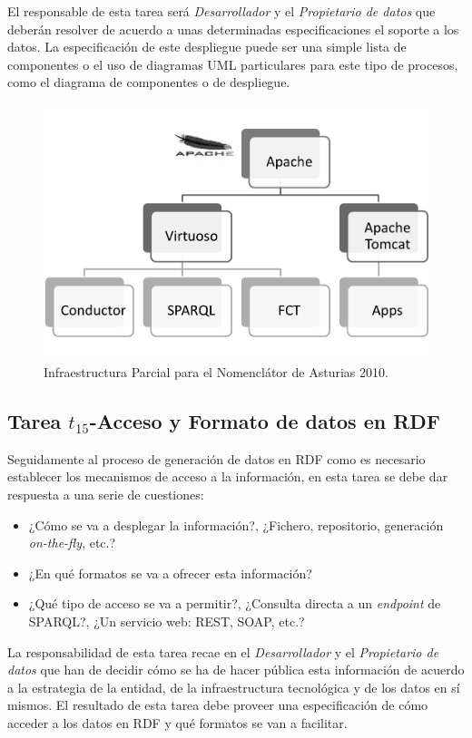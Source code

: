 El responsable de esta tarea será \textit{Desarrollador} y el \textit{Propietario de datos} que deberán
resolver de acuerdo a unas determinadas especificaciones el soporte a los datos. La especificación
de este despliegue puede ser una simple lista de componentes o el uso de diagramas UML particulares
para este tipo de procesos, como el diagrama de componentes o de despliegue.

\begin{figure}[!htb]
\centering
	\includegraphics[width=12cm]{images/phd/infra-ld}
\caption{Infraestructura Parcial para el Nomenclátor de Asturias 2010.}
\label{fig:deploy-nomenclator}
\end{figure}

\subsection{Tarea $t_{15}$-Acceso y Formato de datos en RDF}
Seguidamente al proceso de generación de datos en RDF como \linkeddata es necesario establecer
los mecanismos de acceso a la información, en esta tarea se debe dar respuesta a una
serie de cuestiones:
\begin{itemize}
 \item ¿Cómo se va a desplegar la información?, ¿Fichero, repositorio, generación \textit{on-the-fly}, etc.?
 \item ¿En qué formatos se va a ofrecer esta información?
 \item ¿Qué tipo de acceso se va a permitir?, ¿Consulta directa a un \textit{endpoint} de \gls{SPARQL}?, ¿Un servicio web: \gls{REST}, \gls{SOAP}, etc.?
\end{itemize}

La responsabilidad de esta tarea recae en el \textit{Desarrollador} y el \textit{Propietario de datos} que han de decidir 
cómo se ha de hacer pública esta información de acuerdo a la estrategia de la entidad, de la infraestructura tecnológica y de los datos en sí mismos. 
El resultado de esta tarea debe proveer una especificación de cómo acceder a los datos en RDF y qué formatos se van a facilitar.

